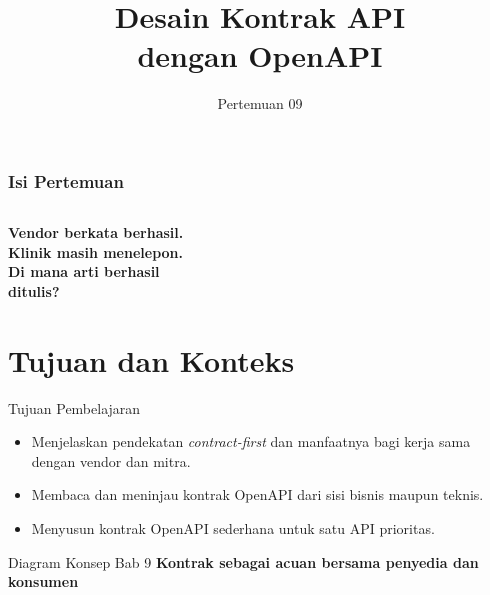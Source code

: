 \documentclass[aspectratio=169, table, 12pt]{beamer}
\title{\Huge Desain Kontrak API\\ \vspace{10pt} dengan OpenAPI}
\date{Pertemuan 09}
\begin{document}
\frame{\titlepage}

\begin{frame}
  \frametitle{Isi Pertemuan}
  \vspace{14pt}
  \begin{columns}[t]
    {\small\tableofcontents[sections={1-4}]}

    {\small\tableofcontents[sections={5-9}]}
  \end{columns}
\end{frame}

\begin{frame}{\hfill}
  \centering
  \Huge{\textbf{Vendor berkata berhasil.\\Klinik masih menelepon.\\Di mana arti berhasil\\ditulis?}}
\end{frame}

\section{Tujuan dan Konteks}

\begin{frame}{{\Large Tujuan Pembelajaran}}
  \vspace{10pt}
  \begin{itemize}
    \item Menjelaskan pendekatan \textit{contract-first} dan manfaatnya bagi kerja sama dengan vendor dan mitra.
    \item Membaca dan meninjau kontrak OpenAPI dari sisi bisnis maupun teknis.
    \item Menyusun kontrak OpenAPI sederhana untuk satu API prioritas.
  \end{itemize}
\end{frame}

\begin{frame}{{\Large Diagram Konsep Bab 9}}
  \centering
  {\small\bfseries Kontrak sebagai acuan bersama penyedia dan konsumen}\par\medskip
\end{frame}
\end{document}

